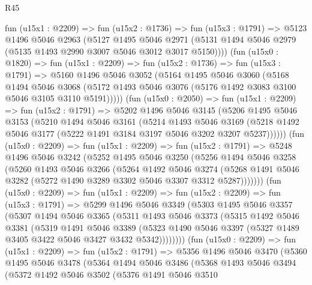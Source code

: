 \begin{lexlean}{R45}
\begin{coremodule}
    fun (u15x1 : @2209) =>
    fun (u15x2 : @1736) =>
    fun (u15x3 : @1791) =>
    @5123
      @1496
      @5046
      @2963
      (@5127
        @1495
        @5046
        @2971
        (@5131 @1494 @5046 @2979 (@5135 @1493 @2990 @3007 @5046 @3012 @3017 @5150))))
    (fun (u15x0 : @1820) =>
    fun (u15x1 : @2209) =>
    fun (u15x2 : @1736) =>
    fun (u15x3 : @1791) =>
    @5160
      @1496
      @5046
      @3052
      (@5164
        @1495
        @5046
        @3060
        (@5168
          @1494
          @5046
          @3068
          (@5172 @1493 @5046 @3076 (@5176 @1492 @3083 @3100 @5046 @3105 @3110 @5191)))))
    (fun (u15x0 : @2050) =>
    fun (u15x1 : @2209) =>
    fun (u15x2 : @1791) =>
    @5202
      @1496
      @5046
      @3145
      (@5206
        @1495
        @5046
        @3153
        (@5210
          @1494
          @5046
          @3161
          (@5214
            @1493
            @5046
            @3169
            (@5218 @1492 @5046 @3177 (@5222 @1491 @3184 @3197 @5046 @3202 @3207 @5237))))))
    (fun (u15x0 : @2209) =>
    fun (u15x1 : @2209) =>
    fun (u15x2 : @1791) =>
    @5248
      @1496
      @5046
      @3242
      (@5252
        @1495
        @5046
        @3250
        (@5256
          @1494
          @5046
          @3258
          (@5260
            @1493
            @5046
            @3266
            (@5264
              @1492
              @5046
              @3274
              (@5268 @1491 @5046 @3282 (@5272 @1490 @3289 @3302 @5046 @3307 @3312 @5287)))))))
    (fun (u15x0 : @2209) =>
    fun (u15x1 : @2209) =>
    fun (u15x2 : @2209) =>
    fun (u15x3 : @1791) =>
    @5299
      @1496
      @5046
      @3349
      (@5303
        @1495
        @5046
        @3357
        (@5307
          @1494
          @5046
          @3365
          (@5311
            @1493
            @5046
            @3373
            (@5315
              @1492
              @5046
              @3381
              (@5319
                @1491
                @5046
                @3389
                (@5323 @1490 @5046 @3397 (@5327 @1489 @3405 @3422 @5046 @3427 @3432 @5342))))))))
    (fun (u15x0 : @2209) =>
    fun (u15x1 : @2209) =>
    fun (u15x2 : @1791) =>
    @5356
      @1496
      @5046
      @3470
      (@5360
        @1495
        @5046
        @3478
        (@5364
          @1494
          @5046
          @3486
          (@5368
            @1493
            @5046
            @3494
            (@5372
              @1492
              @5046
              @3502
              (@5376
                @1491
                @5046
                @3510

\end{coremodule}
\end{lexlean}
